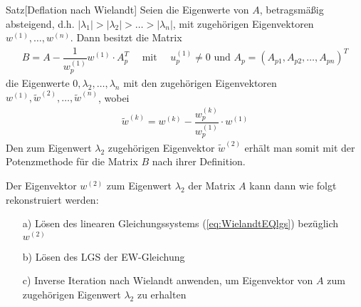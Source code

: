\begin{colbox}{Satz}[Deflation nach Wielandt]\label{satz:Wielandt}
  Seien die Eigenwerte von $A$, betragsmäßig absteigend, d.h. 
  $|\lambda_1|>|\lambda_2|>\dots>|\lambda_n|$, mit zugehörigen Eigenvektoren $w^{(1)},\dots,w^{(n)}$.
  Dann besitzt die Matrix 
  \begin{align*}
    B 
    = A - \dfrac{1}{w_p^{(1)}} w^{(1)}\cdot A_p^T
    \quad\text{ mit }\quad u_p^{(1)}
    \neq 0 
    \text{ und } A_p=(A_{p1},A_{p2},\dots,A_{pn})^T
  \end{align*}
  die Eigenwerte $0,\lambda_2,\dots,\lambda_n$ mit den zugehörigen Eigenvektoren 
  $w^{(1)},\tilde{w}^{(2)},\dots,\tilde{w}^{(n)}$, wobei
  \begin{align*}
    \tilde{w}^{(k)} 
    = w^{(k)} - \dfrac{w_p^{(k)}}{w_p^{(1)}}\cdot w^{(1)}
    \tag{*}\label{eq:WielandtEQlgs}
  \end{align*}
  Den zum Eigenwert $\lambda_2$ zugehörigen Eigenvektor $\tilde{w}^{(2)}$ erhält man somit mit der 
  Potenzmethode für die Matrix $B$ nach ihrer Definition. 

  Der Eigenvektor $w^{(2)}$ zum Eigenwert $\lambda_2$ der Matrix $A$ kann dann wie folgt rekonstruiert werden:
  \begin{enumerate}
    \item[a)] Lösen des linearen Gleichungssystems (\ref{eq:WielandtEQlgs}) bezüglich $w^{(2)}$ 
    \item[b)] Lösen des LGS der EW-Gleichung  
    \item[c)] Inverse Iteration nach Wielandt anwenden, um Eigenvektor von $A$ zum zugehörigen Eigenwert
    $\lambda_2$ zu erhalten 
  \end{enumerate}
\end{colbox}


